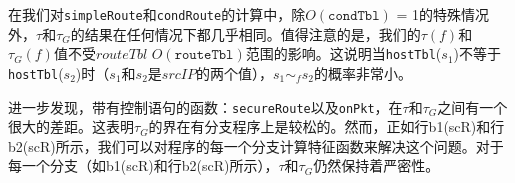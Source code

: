 \documentclass{ctexart}
\begin{document}
在我们对\texttt{simpleRoute}和\texttt{condRoute}的计算中，除$O(\texttt{condTbl})$ = 1的特殊情况外，$\tau$和$\tau_G$的结果在任何情况下都几乎相同。值得注意的是，我们的$\tau(f)$和$\tau_G(f)$值不受$routeTbl$ $O(\texttt{routeTbl})$范围的影响。这说明当\texttt{hostTbl}($s_1$)不等于\texttt{hostTbl}($s_2$)时（$s_1$和$s_2$是$srcIP$的两个值），$s_1 \sim_f s_2$的概率非常小。



进一步发现，带有控制语句的函数：\texttt{secureRoute}以及\texttt{onPkt}，在$\tau$和$\tau_G$之间有一个很大的差距。这表明$\tau_G$的界在有分支程序上是较松的。然而，正如行b1(scR)和行b2(scR)所示，我们可以对程序的每一个分支计算特征函数来解决这个问题。对于每一个分支（如b1(scR)和行b2(scR)所示），$\tau$和$\tau_G$仍然保持着严密性。

\end{document}
